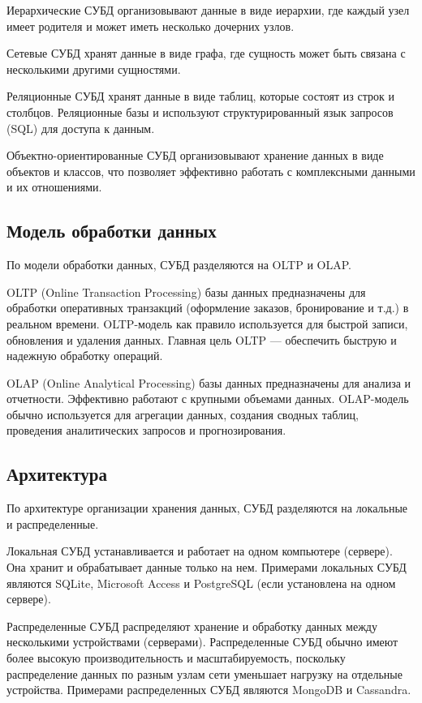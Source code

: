 Иерархические СУБД организовывают данные в виде иерархии, где каждый узел имеет родителя и может иметь несколько дочерних узлов.

Сетевые СУБД хранят данные в виде графа, где сущность может быть связана с несколькими другими сущностями.

Реляционные СУБД хранят данные в виде таблиц, которые состоят из строк и столбцов.
Реляционные базы и используют структурированный язык запросов (SQL) для доступа к данным.

Объектно-ориентированные СУБД организовывают хранение данных в виде объектов и классов, что позволяет эффективно работать с комплексными данными и их отношениями.

\subsection{Модель обработки данных}
По модели обработки данных, СУБД разделяются на OLTP и OLAP.

OLTP (Online Transaction Processing) базы данных предназначены для обработки оперативных транзакций (оформление заказов, бронирование и т.д.) в реальном времени.
OLTP-модель как правило используется для быстрой записи, обновления и удаления данных.
Главная цель OLTP --- обеспечить быструю и надежную обработку операций.

OLAP (Online Analytical Processing) базы данных предназначены для анализа и отчетности. Эффективно работают с крупными объемами данных.
OLAP-модель обычно используется для агрегации данных, создания сводных таблиц, проведения аналитических запросов и прогнозирования.

\subsection{Архитектура}
По архитектуре организации хранения данных, СУБД разделяются на локальные и распределенные.

Локальная СУБД устанавливается и работает на одном компьютере (сервере).
Она хранит и обрабатывает данные только на нем.
Примерами локальных СУБД являются SQLite, Microsoft Access и PostgreSQL (если установлена на одном сервере).

Распределенные СУБД распределяют хранение и обработку данных между несколькими устройствами (серверами).
Распределенные СУБД обычно имеют более высокую производительность и масштабируемость, поскольку распределение данных по разным узлам сети уменьшает нагрузку на отдельные устройства.
Примерами распределенных СУБД являются MongoDB и Cassandra.

